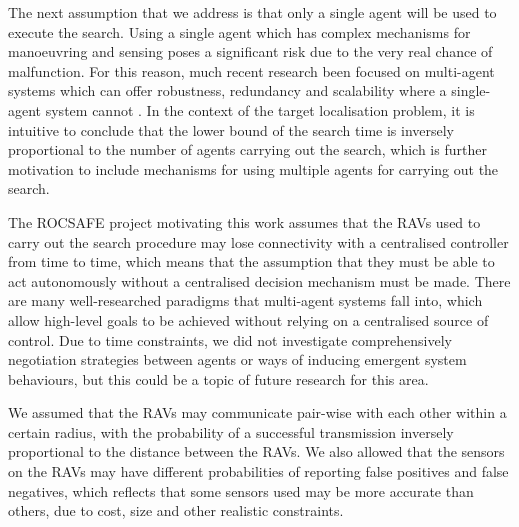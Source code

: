 The next assumption that we address is that only a single agent will be used to execute the search. Using a single agent which has complex mechanisms for manoeuvring and sensing poses a significant risk due to the very real chance of malfunction. For this reason, much recent research been focused on multi-agent systems which can offer robustness, redundancy and scalability where a single-agent system cannot \cite{Stone2000MultiagentPerspective}. In the context of the target localisation problem, it is intuitive to conclude that the lower bound of the search time is inversely proportional to the number of agents carrying out the search, which is further motivation to include mechanisms for using multiple agents for carrying out the search.

The ROCSAFE project \cite{Bagherzadeh2017ROCSAFE:Incidents} motivating this work assumes that the RAVs used to carry out the search procedure may lose connectivity with a centralised controller from time to time, which means that the assumption that they must be able to act autonomously without a centralised decision mechanism must be made. There are many well-researched paradigms that multi-agent systems fall into, which allow high-level goals to be achieved without relying on a centralised source of control. Due to time constraints, we did not investigate comprehensively negotiation strategies between agents or ways of inducing emergent system behaviours, but this could be a topic of future research for this area.\par

We assumed that the RAVs may communicate pair-wise with each other within a certain radius, with the probability of a successful transmission inversely proportional to the distance between the RAVs. We also allowed that the sensors on the RAVs may have different probabilities of reporting false positives and false negatives, which reflects that some sensors used may be more accurate than others, due to cost, size and other realistic constraints. \par

